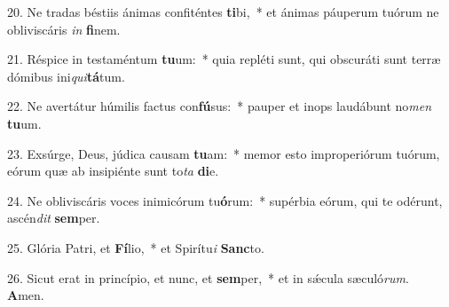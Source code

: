20. Ne tradas béstiis ánimas confiténtes \textbf{ti}bi,~*  et ánimas páuperum tuórum ne obliviscáris \textit{in} \textbf{fi}nem.\

21. Réspice in testaméntum \textbf{tu}um:~*  quia repléti sunt, qui obscuráti sunt terræ dómibus ini\textit{qui}\textbf{tá}tum.\

22. Ne avertátur húmilis factus con\textbf{fú}sus:~*  pauper et inops laudábunt no\textit{men} \textbf{tu}um.\

23. Exsúrge, Deus, júdica causam \textbf{tu}am:~*  memor esto improperiórum tuórum, eórum quæ ab insipiénte sunt to\textit{ta} \textbf{di}e.\

24. Ne obliviscáris voces inimicórum tu\textbf{ó}rum:~*  supérbia eórum, qui te odérunt, ascén\textit{dit} \textbf{sem}per.\

25. Glória Patri, et \textbf{Fí}lio,~*  et Spirítu\textit{i} \textbf{Sanc}to.\

26. Sicut erat in princípio, et nunc, et \textbf{sem}per,~*  et in sǽcula sæculó\textit{rum}. \textbf{A}men.\


